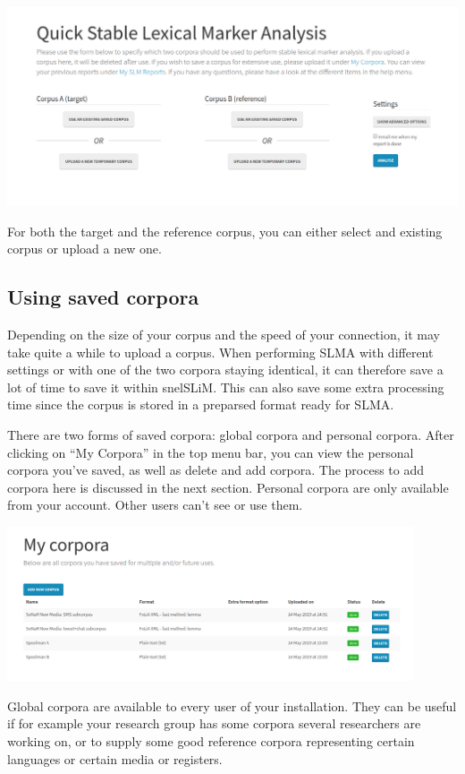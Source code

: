 \documentclass[11pt,a4paper]{article}
\begin{document}
\centerline{\includegraphics[width=\textwidth]{images/form.png}}

For both the target and the reference corpus, you can either select and existing corpus or upload a new one. 

\subsection{Using saved corpora}

Depending on the size of your corpus and the speed of your connection, it may take quite a while to upload a corpus. When performing SLMA with different settings or with one of the two corpora staying identical, it can therefore save a lot of time to save it within snelSLiM. This can also save some extra processing time since the corpus is stored in a preparsed format ready for SLMA.

There are two forms of saved corpora: global corpora and personal corpora. After clicking on ``My Corpora'' in the top menu bar, you can view the personal corpora you've saved, as well as delete and add corpora. The process to add corpora here is discussed in the next section. Personal corpora are only available from your account. Other users can't see or use them.

\centerline{\includegraphics[width=0.9\textwidth]{images/mycorpora.png}}

Global corpora are available to every user of your installation. They can be useful if for example your research group has some corpora several researchers are working on, or to supply some good reference corpora representing certain languages or certain media or registers. 
\end{document}
